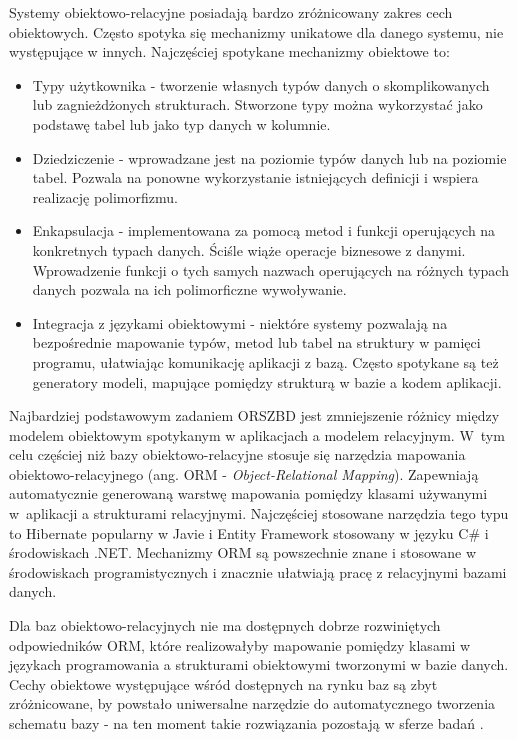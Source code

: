 \documentclass[a4paper,twoside,12pt]{book}
\begin{document}
Systemy obiektowo-relacyjne posiadają bardzo zróżnicowany zakres cech obiektowych. Często spotyka się mechanizmy unikatowe dla danego systemu, nie występujące w innych. Najczęściej spotykane mechanizmy obiektowe to:
\begin{itemize}
    \item Typy użytkownika - tworzenie własnych typów danych o skomplikowanych lub zagnieżdżonych strukturach. Stworzone typy można wykorzystać jako podstawę tabel lub jako typ danych w kolumnie.
    \item Dziedziczenie - wprowadzane jest na poziomie typów danych lub na poziomie tabel. Pozwala na ponowne wykorzystanie istniejących definicji i wspiera realizację polimorfizmu.
    \item Enkapsulacja - implementowana za pomocą metod i funkcji operujących na konkretnych typach danych. Ściśle wiąże operacje biznesowe z danymi. Wprowadzenie funkcji o tych samych nazwach operujących na różnych typach danych pozwala na ich polimorficzne wywoływanie.
    \item Integracja z językami obiektowymi - niektóre systemy pozwalają na bezpośrednie mapowanie typów, metod lub tabel na struktury w pamięci programu, ułatwiając komunikację aplikacji z bazą. Często spotykane są też generatory modeli, mapujące pomiędzy strukturą w bazie a kodem aplikacji.
\end{itemize}

Najbardziej podstawowym zadaniem ORSZBD jest zmniejszenie różnicy między modelem obiektowym spotykanym w aplikacjach a modelem relacyjnym. W~tym celu częściej niż bazy obiektowo-relacyjne stosuje się narzędzia mapowania obiektowo-relacyjnego (ang. ORM - \textit{Object-Relational Mapping}). Zapewniają automatycznie generowaną warstwę mapowania pomiędzy klasami używanymi w~aplikacji a strukturami relacyjnymi. Najczęściej stosowane narzędzia tego typu to Hibernate popularny w Javie i Entity Framework stosowany w języku C\# i środowiskach .NET. Mechanizmy ORM są powszechnie znane i stosowane w środowiskach programistycznych i znacznie ułatwiają pracę z relacyjnymi bazami danych.

Dla baz obiektowo-relacyjnych nie ma dostępnych dobrze rozwiniętych odpowiedników ORM, które realizowałyby mapowanie pomiędzy klasami w językach programowania a strukturami obiektowymi tworzonymi w bazie danych. Cechy obiektowe występujące wśród dostępnych na rynku baz są zbyt zróżnicowane, by powstało uniwersalne narzędzie do automatycznego tworzenia schematu bazy - na ten moment takie rozwiązania pozostają w sferze badań \cite{bib:o-odm-framework}.
\end{document}
